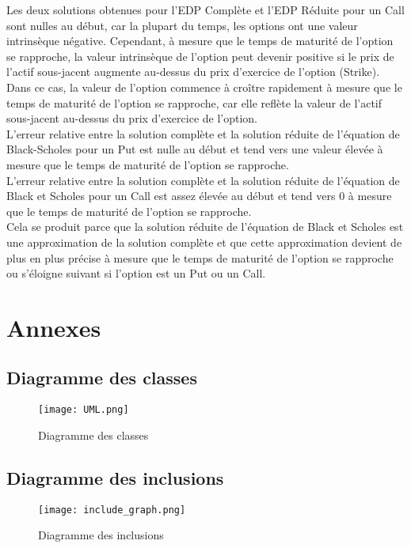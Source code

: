 \documentclass[11pt,a4paper]{article}
\begin{document}
Les deux solutions obtenues pour l'EDP Complète et l'EDP Réduite pour un Call sont nulles au début, car la plupart du temps, les options ont une valeur intrinsèque négative. Cependant, à mesure que le temps de maturité de l'option se rapproche, la valeur intrinsèque de l'option peut devenir positive si le prix de l'actif sous-jacent augmente au-dessus du prix d'exercice de l'option (Strike). Dans ce cas, la valeur de l'option commence à croître rapidement à mesure que le temps de maturité de l'option se rapproche, car elle reflète la valeur de l'actif sous-jacent au-dessus du prix d'exercice de l'option.\\

L'erreur relative entre la solution complète et la solution réduite de l'équation de Black-Scholes pour un Put est nulle au début et tend vers une valeur élevée à mesure que le temps de maturité de l'option se rapproche.\\

L'erreur relative entre la solution complète et la solution réduite de l'équation de Black et Scholes pour un Call est assez élevée au début et tend vers 0 à mesure que le temps de maturité de l'option se rapproche.\\

Cela se produit parce que la solution réduite de l'équation de Black et Scholes est une approximation de la solution complète et que cette approximation devient de plus en plus précise à mesure que le temps de maturité de l'option se rapproche ou s'éloigne suivant si l'option est un Put ou un Call.

\newpage

\section{Annexes}

\subsection{Diagramme des classes}

\begin{figure}[!ht]
    \centering
    \texttt{[image: UML.png]}
    \caption{Diagramme des classes}
\end{figure}

\vspace{0.5cm}

\subsection{Diagramme des inclusions}

\begin{figure}[!ht]
    \centering
    \texttt{[image: include\_graph.png]}
    \caption{Diagramme des inclusions}
\end{figure}
\end{document}
